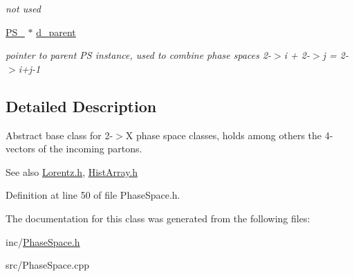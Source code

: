 \begin{DoxyCompactItemize}
\begin{DoxyCompactList}\small\item\em not used \end{DoxyCompactList}\item 
\hypertarget{classPS__2_abebb860c3c4a1c5054bc223d3aac4f45}{}\hyperlink{classPS__2}{P\+S\+\_} $\ast$ \hyperlink{classPS__2_abebb860c3c4a1c5054bc223d3aac4f45}{d\+\_\+parent}\label{classPS__2_abebb860c3c4a1c5054bc223d3aac4f45}

\begin{DoxyCompactList}\small\item\em pointer to parent P\+S instance, used to combine phase spaces 2-\/$>$i + 2-\/$>$j = 2-\/$>$i+j-\/1 \end{DoxyCompactList}\end{DoxyCompactItemize}


\subsection{Detailed Description}
Abstract base class for 2-\/$>$X phase space classes, holds among others the 4-\/vectors of the incoming partons. \begin{DoxySeeAlso}{See also}
\hyperlink{Lorentz_8h}{Lorentz.\+h}, \hyperlink{HistArray_8h}{Hist\+Array.\+h} 
\end{DoxySeeAlso}


Definition at line 50 of file Phase\+Space.\+h.



The documentation for this class was generated from the following files\+:\begin{DoxyCompactItemize}
\item 
inc/\hyperlink{PhaseSpace_8h}{Phase\+Space.\+h}\item 
src/Phase\+Space.\+cpp\end{DoxyCompactItemize}
